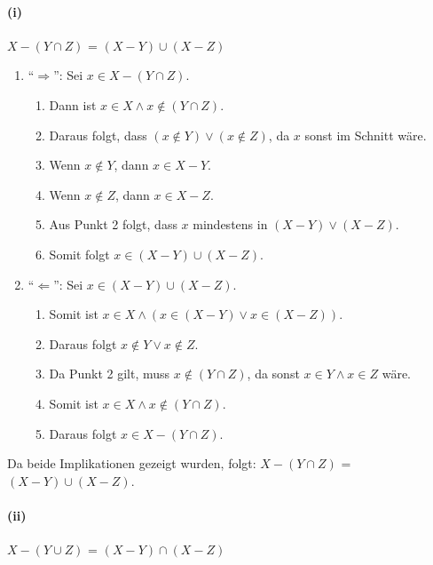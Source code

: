 \documentclass[12pt, letterpaper]{article}
\begin{document}
\paragraph{(i)} $X - (Y \cap Z)$ = $(X - Y) \cup (X - Z)$

\begin{enumerate}
    \item[]{``$\Rightarrow$'':} Sei $x \in X - (Y \cap Z)$.
        \begin{enumerate}[label=$\circ$]
            \item Dann ist $x \in X \land x \notin (Y \cap Z)$.
            \item Daraus folgt, dass $(x \notin Y) \lor (x \notin Z)$, da $x$ sonst im Schnitt wäre.
            \item Wenn $x \notin Y$, dann $x \in X - Y$.
            \item Wenn $x \notin Z$, dann $x \in X - Z$.
            \item Aus Punkt 2 folgt, dass $x$ mindestens in $(X - Y) \lor (X - Z)$.
            \item Somit folgt $x \in (X - Y) \cup (X - Z)$.
        \end{enumerate}
    \item[]{``$\Leftarrow$'':} Sei $x \in (X - Y) \cup (X - Z)$.
        \begin{enumerate}[label=$\circ$]
            \item Somit ist $x \in X \land (x \in (X- Y) \lor x \in (X - Z))$.
            \item Daraus folgt $x \notin Y \lor x \notin Z$.
            \item Da Punkt 2 gilt, muss $x \notin (Y \cap Z)$, da sonst $x \in Y \land x \in Z$ wäre.
            \item Somit ist $x \in X \land x \notin (Y \cap Z)$.
            \item Daraus folgt $x \in X - (Y \cap Z)$.
        \end{enumerate}
\end{enumerate}

\noindent Da beide Implikationen gezeigt wurden, folgt: $X - (Y \cap Z)$ = $(X - Y) \cup (X - Z)$.

\paragraph{(ii)} $X - (Y \cup Z)$ = $(X - Y) \cap (X - Z)$
\end{document}
